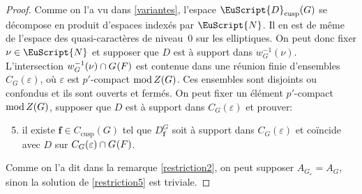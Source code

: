 \documentclass[JEP,XML,SOM,Unicode,francais]{cedram}
\let\mathcal \EuScript
\newcommand{\NoChangel}[1]{%
\expandafter\let\csname old\string#1\endcsname=#1
\let#1=\relax
\newcommand{#1}{\mathcode`l="716C\csname old\string#1\endcsname\mathcode`l="7160 }%
}
\let\epsilon\varepsilon
\newcommand{\rmod}{\textup{mod}\,}
\newcommand{\cusp}{\mathrm{cusp}}
\newcommand{\rell}{\mathrm{ell}} \NoChangel{\rell}
\newcommand{\bmf}{\boldsymbol{f}}
\newcommand{\cD}{\mathcal{D}}
\newcommand{\cN}{\mathcal{N}}
\theoremstyle{plain}
\theoremstyle{definition}
\begin{document}
\begin{proof}
Comme on l'a vu dans \ref{variantes}, l'espace $\cD_{\cusp}(G)$ se décompose en produit d'espaces indexés par $\cN$. Il en est de même de l'espace des quasi-caractères de niveau~$0$ sur les elliptiques. On peut donc fixer $\nu\in \cN$ et supposer que
$D$ est à support dans $w_{G}^{-1}(\nu)$. L'intersection $w_{G}^{-1}(\nu)\cap G_{\rell}(F)$ est contenue dans une réunion finie d'ensembles $ C_{G}(\epsilon )$, où $\epsilon$ est $p'$-compact $\rmod Z(G)$. Ces ensembles sont disjoints ou confondus et ils sont ouverts et fermés. On peut fixer un élément $p'$-compact $\rmod Z(G)$, supposer que $D$ est à support dans $ C_{G}(\epsilon)$ et prouver:
\begin{enumerate}\setcounter{enumi}{4}
\item\label{restriction5}
il existe $\bmf\in C_{\cusp}(G)$ tel que $D^G_{\bmf}$ soit à support dans $C_{G}(\epsilon)$ et coïncide avec $D$ sur $C_{G}(\epsilon)\cap G_{\rell}(F)$.
\end{enumerate}

Comme on l'a dit dans la remarque \eqref{restriction2}, on peut supposer $A_{G_{\epsilon}}=A_{G}$, sinon la solution de \eqref{restriction5} est triviale.


\end{proof}
\end{document}
